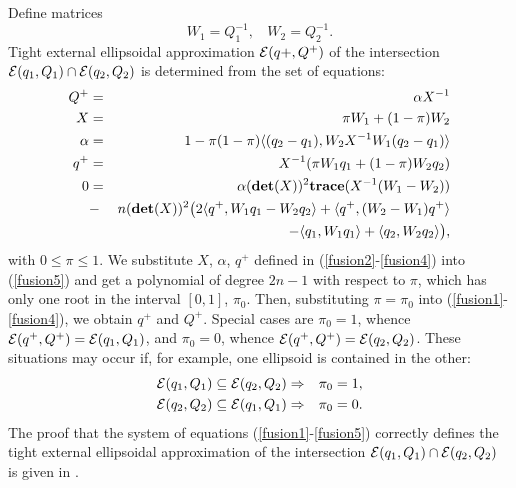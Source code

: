 Define matrices
\begin{equation}
W_1 = Q_1^{-1}, ~~~~ W_2 = Q_2^{-1} .\label{wmatrices}
\end{equation}
Tight external ellipsoidal approximation $\EE(q+,Q^+)$ of
the intersection $\EE(q_1,Q_1)\cap\EE(q_2,Q_2)$ is determined from the set
of equations:
\begin{eqnarray}
Q^+ & = & \alpha X^{-1} \label{fusion1} \\
X & = & \pi W_1 + (1-\pi)W_2 \label{fusion2} \\
\alpha & = & 1-\pi(1-\pi)\langle(q_2-q_1), W_2X^{-1}W_1(q_2-q_1)\rangle
\label{fusion3} \\
q^+ & = & X^{-1}(\pi W_1q_1 + (1-\pi)W_2q_2) \label{fusion4} \\
0 & = & \alpha({\bf det}(X))^2{\bf trace}(X^{-1}(W_1-W_2)) \nonumber \\
& - & n({\bf det}(X))^2
\big{(}2\langle q^+,W_1q_1-W_2q_2\rangle +
\langle q^+,(W_2-W_1)q^+\rangle \nonumber\\
&  & - \langle q_1,W_1q_1\rangle +
\langle q_2,W_2q_2\rangle\big{)}, \label{fusion5}
\end{eqnarray}
with $0\leq\pi\leq1$. We substitute $X$, $\alpha$, $q^+$ defined in
(\ref{fusion2}-\ref{fusion4}) into (\ref{fusion5}) and get a polynomial of
degree $2n-1$ with respect to $\pi$, which has only one root in the
interval $[0,1]$, $\pi_0$. Then, substituting $\pi=\pi_0$ into
(\ref{fusion1}-\ref{fusion4}), we obtain $q^+$ and $Q^+$.
Special cases are $\pi_0=1$, whence $\EE(q^+,Q^+)=\EE(q_1,Q_1)$, and
$\pi_0=0$, whence $\EE(q^+,Q^+)=\EE(q_2,Q_2)$. These situations may occur
if, for example, one ellipsoid is contained in the other:
\begin{eqnarray*}
\EE(q_1,Q_1)\subseteq\EE(q_2,Q_2) & \Rightarrow & \pi_0 = 1,\\
\EE(q_2,Q_2)\subseteq\EE(q_1,Q_1) & \Rightarrow & \pi_0 = 0.\\
\end{eqnarray*}
The proof that the system of equations (\ref{fusion1}-\ref{fusion5})
correctly defines the tight external ellipsoidal approximation
of the intersection $\EE(q_1,Q_1)\cap\EE(q_2,Q_2)$ is given in \cite{fusion}.

